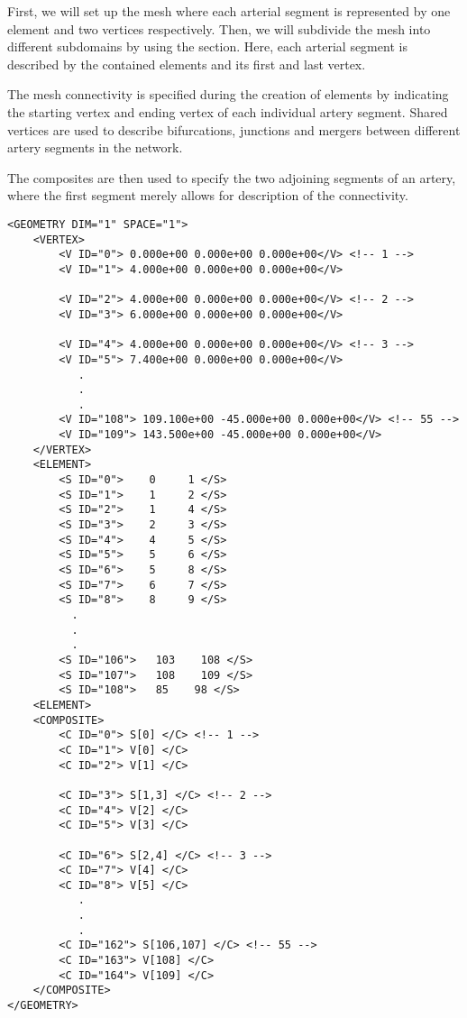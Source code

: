 First, we will set up the mesh where each arterial segment is represented by one
element and two vertices respectively. Then, we will subdivide the mesh into
different subdomains by using the  section. Here, each
arterial segment is described by the contained elements and its first and last
vertex.

The mesh connectivity is specified during the creation of elements by indicating
the starting vertex and ending vertex of each individual artery segment. Shared
vertices are used to describe bifurcations, junctions and mergers between
different artery segments in the network.

The composites are then used to specify the two adjoining segments of an artery,
where the first segment merely allows for description of the connectivity.

\begin{lstlisting}[style=XmlStyle]
<GEOMETRY DIM="1" SPACE="1">
    <VERTEX>
        <V ID="0"> 0.000e+00 0.000e+00 0.000e+00</V> <!-- 1 -->
        <V ID="1"> 4.000e+00 0.000e+00 0.000e+00</V>

        <V ID="2"> 4.000e+00 0.000e+00 0.000e+00</V> <!-- 2 -->
        <V ID="3"> 6.000e+00 0.000e+00 0.000e+00</V>

        <V ID="4"> 4.000e+00 0.000e+00 0.000e+00</V> <!-- 3 -->
        <V ID="5"> 7.400e+00 0.000e+00 0.000e+00</V>
           .
           .
           .
        <V ID="108"> 109.100e+00 -45.000e+00 0.000e+00</V> <!-- 55 -->
        <V ID="109"> 143.500e+00 -45.000e+00 0.000e+00</V>
    </VERTEX>
    <ELEMENT>
        <S ID="0">    0     1 </S>
        <S ID="1">    1     2 </S>
        <S ID="2">    1     4 </S>
        <S ID="3">    2     3 </S>
        <S ID="4">    4     5 </S>
        <S ID="5">    5     6 </S>
        <S ID="6">    5     8 </S>
        <S ID="7">    6     7 </S>
        <S ID="8">    8     9 </S>
          .
          .
          .
        <S ID="106">   103    108 </S>
        <S ID="107">   108    109 </S>
        <S ID="108">   85    98 </S>
    <ELEMENT>
    <COMPOSITE>
        <C ID="0"> S[0] </C> <!-- 1 -->
        <C ID="1"> V[0] </C>
        <C ID="2"> V[1] </C>

        <C ID="3"> S[1,3] </C> <!-- 2 -->
        <C ID="4"> V[2] </C>
        <C ID="5"> V[3] </C> 

        <C ID="6"> S[2,4] </C> <!-- 3 -->
        <C ID="7"> V[4] </C>
        <C ID="8"> V[5] </C>
           .
           .
           .
        <C ID="162"> S[106,107] </C> <!-- 55 -->
        <C ID="163"> V[108] </C>
        <C ID="164"> V[109] </C>            
    </COMPOSITE>
</GEOMETRY>
\end{lstlisting}

